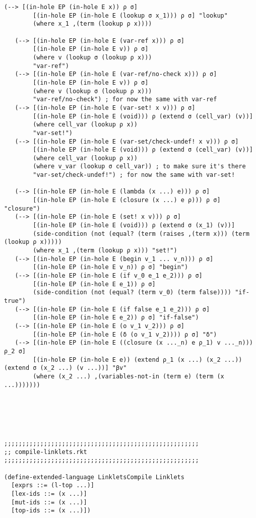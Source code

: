 \begin{lstlisting}[language=pltredex,
                basicstyle=\ttfamily\scriptsize,
                numbers=none, xleftmargin=2em]
   (--> [(in-hole EP (in-hole E x)) ρ σ]
        [(in-hole EP (in-hole E (lookup σ x_1))) ρ σ] "lookup"
        (where x_1 ,(term (lookup ρ x))))

   (--> [(in-hole EP (in-hole E (var-ref x))) ρ σ]
        [(in-hole EP (in-hole E v)) ρ σ]
        (where v (lookup σ (lookup ρ x)))
        "var-ref")
   (--> [(in-hole EP (in-hole E (var-ref/no-check x))) ρ σ]
        [(in-hole EP (in-hole E v)) ρ σ]
        (where v (lookup σ (lookup ρ x)))
        "var-ref/no-check") ; for now the same with var-ref
   (--> [(in-hole EP (in-hole E (var-set! x v))) ρ σ]
        [(in-hole EP (in-hole E (void))) ρ (extend σ (cell_var) (v))]
        (where cell_var (lookup ρ x))
        "var-set!")
   (--> [(in-hole EP (in-hole E (var-set/check-undef! x v))) ρ σ]
        [(in-hole EP (in-hole E (void))) ρ (extend σ (cell_var) (v))]
        (where cell_var (lookup ρ x))
        (where v_var (lookup σ cell_var)) ; to make sure it's there
        "var-set/check-undef!") ; for now the same with var-set!

   (--> [(in-hole EP (in-hole E (lambda (x ...) e))) ρ σ]
        [(in-hole EP (in-hole E (closure (x ...) e ρ))) ρ σ] "closure")
   (--> [(in-hole EP (in-hole E (set! x v))) ρ σ]
        [(in-hole EP (in-hole E (void))) ρ (extend σ (x_1) (v))]
        (side-condition (not (equal? (term (raises ,(term x))) (term (lookup ρ x)))))
        (where x_1 ,(term (lookup ρ x))) "set!")
   (--> [(in-hole EP (in-hole E (begin v_1 ... v_n))) ρ σ]
        [(in-hole EP (in-hole E v_n)) ρ σ] "begin")
   (--> [(in-hole EP (in-hole E (if v_0 e_1 e_2))) ρ σ]
        [(in-hole EP (in-hole E e_1)) ρ σ]
        (side-condition (not (equal? (term v_0) (term false)))) "if-true")
   (--> [(in-hole EP (in-hole E (if false e_1 e_2))) ρ σ]
        [(in-hole EP (in-hole E e_2)) ρ σ] "if-false")
   (--> [(in-hole EP (in-hole E (o v_1 v_2))) ρ σ]
        [(in-hole EP (in-hole E (δ (o v_1 v_2)))) ρ σ] "δ")
   (--> [(in-hole EP (in-hole E ((closure (x ..._n) e ρ_1) v ..._n))) ρ_2 σ]
        [(in-hole EP (in-hole E e)) (extend ρ_1 (x ...) (x_2 ...)) (extend σ (x_2 ...) (v ...))] "βv"
        (where (x_2 ...) ,(variables-not-in (term e) (term (x ...)))))))






;;;;;;;;;;;;;;;;;;;;;;;;;;;;;;;;;;;;;;;;;;;;;;;;;;;;;;
;; compile-linklets.rkt
;;;;;;;;;;;;;;;;;;;;;;;;;;;;;;;;;;;;;;;;;;;;;;;;;;;;;;

(define-extended-language LinkletsCompile Linklets
  [exprs ::= (l-top ...)]
  [lex-ids ::= (x ...)]
  [mut-ids ::= (x ...)]
  [top-ids ::= (x ...)])


\end{lstlisting}

